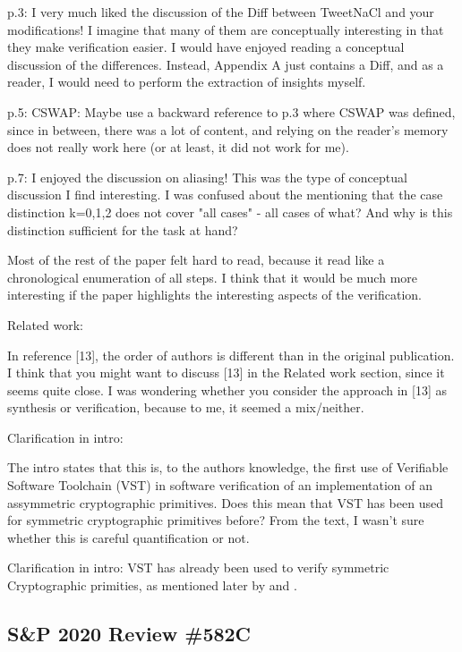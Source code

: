 p.3: I very much liked the discussion of the Diff between TweetNaCl and your
modifications! I imagine that many of them are conceptually interesting in that
they make verification easier. I would have enjoyed reading a conceptual
discussion of the differences. Instead, Appendix A just contains a Diff, and as
a reader, I would need to perform the extraction of insights myself.

p.5: CSWAP: Maybe use a backward reference to p.3 where CSWAP was defined, since
in between, there was a lot of content, and relying on the reader's memory does
not really work here (or at least, it did not work for me).

p.7: I enjoyed the discussion on aliasing! This was the type of conceptual
discussion I find interesting. I was confused about the mentioning that the case
distinction k=0,1,2 does not cover "all cases" - all cases of what? And why is
this distinction sufficient for the task at hand?

Most of the rest of the paper felt hard to read, because it read like a
chronological enumeration of all steps. I think that it would be much more
interesting if the paper highlights the interesting aspects of the verification.

Related work:

In reference [13], the order of authors is different than in the original
publication. I think that you might want to discuss [13] in the Related work
section, since it seems quite close. I was wondering whether you consider the
approach in [13] as synthesis or verification, because to me, it seemed a
mix/neither.

Clarification in intro:

The intro states that this is, to the authors knowledge, the first use of
Verifiable Software Toolchain (VST) in software verification of an implementation
of an assymmetric cryptographic primitives. Does this mean that VST has been
used for symmetric cryptographic primitives before? From the text, I wasn't sure
whether this is careful quantification or not.


Clarification in intro: VST has already been used to verify symmetric Cryptographic
primities, as mentioned later by \cite{Beringer2015VerifiedCA} and \cite{2015-Appel}.

\subsection{S\&P 2020 Review \#582C}

